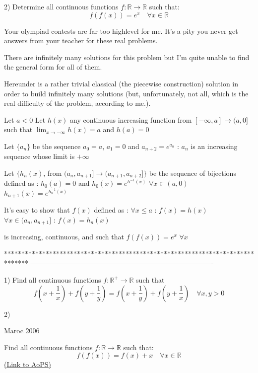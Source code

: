 \begin{solution}
	\begin{tcolorbox}2) Determine all continuous functions $f: \mathbb R\to\mathbb R$ such that:
\[f(f (x)) = e^{x} \quad \forall x\in\mathbb R\]\end{tcolorbox}
Your olympiad contests are far too highlevel for me. It's a pity you never get answers from your teacher for these real problems.

There are infinitely many solutions for this problem but I'm quite unable to find the general form for all of them.

Hereunder is a rather trivial classical (the piecewise construction) solution in order to build infinitely many solutions (but, unfortunately, not all, which is the real difficulty of the problem, according to me.). 

Let $a<0$
Let $h(x)$ any continuous increasing function from $[-\infty,a]\to (a,0]$ such that $\lim_{x\to -\infty}h(x)=a$ and $h(a)=0$

Let $\{a_n\}$ be the sequence $a_0=a$, $a_1=0$ and $a_{n+2}=e^{a_n}$ : $a_n$ is an increasing sequence whose limit is $+\infty$

Let $\{h_n(x)$, from $(a_n,a_{n+1}]\to (a_{n+1},a_{n+2}]\}$ be the sequence of bijections defined as :
$h_0(a)=0$ and $h_0(x)=e^{h^{-1}(x)}$ $\forall x\in(a,0)$
$h_{n+1}(x)=e^{h_n^{-1}(x)}$

It's easy to show that $f(x)$ defined as :
$\forall x\le a$ : $f(x)=h(x)$
$\forall x\in(a_n,a_{n+1}]$ : $f(x)=h_n(x)$

is increasing, continuous, and such that $f(f(x))=e^x$ $\forall x$
\end{solution}
*******************************************************************************
-------------------------------------------------------------------------------

\begin{problem}
	1) Find all continuous functions $f: \mathbb {R}^{+}\to\mathbb R$ such that 
\[f \left(x +\frac{1 }{x}\right) + f \left(y+\frac{1}{ y}\right) = f \left(x+\frac{1 }{ y}\right) + f \left(y+\frac{1 }{ x}\right)\quad \forall x, y> 0\]

2) \begin{bolded}Maroc 2006 \end{bolded}
Find all continuous functions $f: \mathbb R\to\mathbb R$  such that:
\[f (f (x)) = f (x) + x \quad \forall x\in\mathbb R\]
	\flushright \href{https://artofproblemsolving.com/community/c6h566767}{(Link to AoPS)}
\end{problem}



